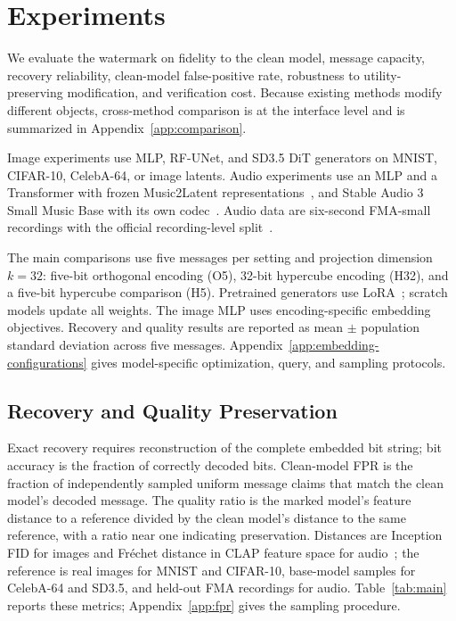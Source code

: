 \documentclass[11pt]{article}
\begin{document}
\section{Experiments}\label{sec:experiments}

We evaluate the watermark on fidelity to the clean model, message
capacity, recovery reliability, clean-model false-positive rate,
robustness to utility-preserving modification, and verification cost.
Because existing methods modify different objects, cross-method
comparison is at the interface level and is summarized in
Appendix~\ref{app:comparison}.

Image experiments use MLP, RF-UNet, and SD3.5 DiT generators on MNIST,
CIFAR-10, CelebA-64, or image latents. Audio experiments use an MLP and
a Transformer with frozen Music2Latent representations~\cite{music2latent},
and Stable Audio 3 Small Music Base with its own codec~\cite{stableaudio3base}.
Audio data are six-second FMA-small recordings with the official
recording-level split~\cite{fmadataset}.

The main comparisons use five messages per setting and projection
dimension $k=32$: five-bit orthogonal encoding (O5), 32-bit hypercube
encoding (H32), and a five-bit hypercube comparison (H5).
Pretrained generators use LoRA~\cite{hu2022lora}; scratch models update
all weights. The image MLP uses encoding-specific embedding objectives.
Recovery and quality results are reported as mean $\pm$ population
standard deviation across five messages. Appendix~\ref{app:embedding-configurations}
gives model-specific optimization, query, and sampling protocols.

\subsection{Recovery and Quality Preservation}

Exact recovery requires reconstruction of the complete embedded bit
string; bit accuracy is the fraction of correctly decoded bits.
Clean-model FPR is the fraction of independently sampled uniform message
claims that match the clean model's decoded message.
The quality ratio is the marked model's feature distance to a reference
divided by the clean model's distance to the same reference, with a
ratio near one indicating preservation. Distances are Inception FID for
images and Fr\'echet distance in CLAP feature space for
audio~\cite{clapcheckpoint}; the reference is real images for MNIST and
CIFAR-10, base-model samples for CelebA-64 and SD3.5, and held-out FMA
recordings for audio. Table~\ref{tab:main} reports these metrics;
Appendix~\ref{app:fpr} gives the sampling procedure.
\end{document}
